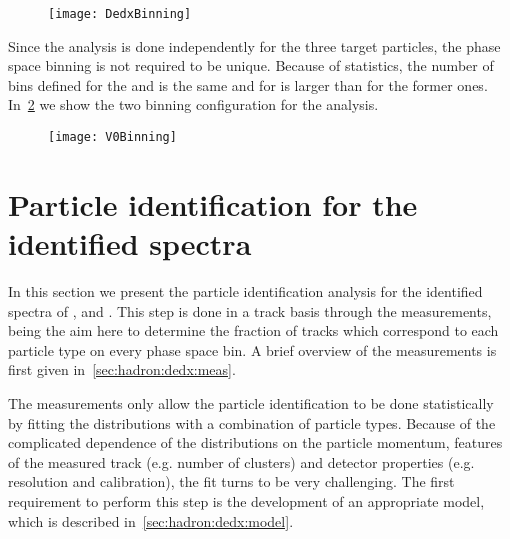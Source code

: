 \begin{figure}[!ht]
  \centering
  \texttt{[image: DedxBinning]}
  \caption{}
  \label{fig:hadron:binning:dedx}
\end{figure}

Since the \vzero analysis is done independently for the three target particles,
the phase space binning is not required to be unique. Because of statistics,
the number of bins defined for the \lamb and \antilamb is the same and
for \kzeros is larger than for the former ones.
In~\cref{fig:hadron:binning:vzero} we show the two
binning configuration for the \vzero analysis.

\begin{figure}[!ht]
  \centering
  \texttt{[image: V0Binning]}
  \caption{}
  \label{fig:hadron:binning:vzero}
\end{figure}


\section{Particle identification for the identified spectra}


In this section we present the particle identification
analysis for the identified spectra of \pions, \kaons and \protons.
This step is done in a track basis through the \dedx measurements,
being the aim here to determine the fraction of tracks which
correspond to each particle type on every phase space bin.
A brief overview of the \dedx measurements is first given
in~\cref{sec:hadron:dedx:meas}.

The \dedx measurements only allow the particle identification
to be done statistically by fitting
the \dedx distributions with a combination of particle
types. Because of the complicated dependence of the \dedx
distributions on the particle momentum,
features of the measured track (e.g. number of clusters) and
detector properties (e.g. resolution and calibration),
the \dedx fit turns to be very challenging. The first
requirement to perform this step is the development
of an appropriate \dedx model,
which is described in~\cref{sec:hadron:dedx:model}.

